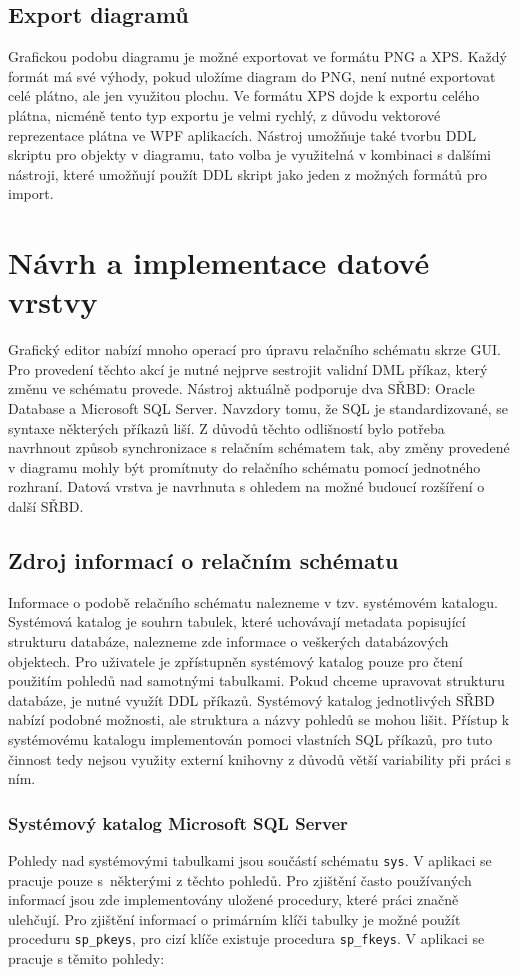 \documentclass[czech,bachelor,public,dept460,male,oneside]{diploma}
\begin{document}
	\subsection{Export diagramů}
	Grafickou podobu diagramu je možné exportovat ve formátu PNG a XPS. Každý formát má své výhody, pokud uložíme diagram do PNG, není nutné exportovat celé plátno, ale jen využitou plochu. Ve formátu XPS dojde k exportu celého plátna, nicméně tento typ exportu je velmi rychlý, z důvodu vektorové reprezentace plátna ve WPF aplikacích. Nástroj umožňuje také tvorbu DDL skriptu pro objekty v diagramu, tato volba je využitelná v kombinaci s dalšími nástroji, které umožňují použít DDL skript jako jeden z možných formátů pro import.
		
\newpage
\section{Návrh a implementace datové vrstvy}
Grafický editor nabízí mnoho operací pro úpravu relačního schématu skrze GUI. Pro provedení těchto akcí je nutné nejprve sestrojit validní DML příkaz, který změnu ve schématu provede. Nástroj aktuálně podporuje dva SŘBD: Oracle Database a Microsoft SQL Server. Navzdory tomu, že SQL je standardizované, se syntaxe některých příkazů liší. Z důvodů těchto odlišností bylo potřeba navrhnout způsob synchronizace s relačním schématem tak, aby změny provedené v diagramu mohly být promítnuty do relačního schématu pomocí jednotného rozhraní. Datová vrstva je navrhnuta s ohledem na možné budoucí rozšíření o další SŘBD.
	
	\subsection{Zdroj informací o relačním schématu} \label{secDataSource}
	Informace o podobě relačního schématu nalezneme v tzv. systémovém katalogu. Systémová katalog je souhrn tabulek, které uchovávají metadata popisující strukturu databáze, nalezneme zde informace o veškerých databázových objektech. Pro uživatele je zpřístupněn systémový katalog pouze pro čtení použitím pohledů nad samotnými tabulkami. Pokud chceme upravovat strukturu databáze, je nutné využít DDL příkazů. Systémový katalog jednotlivých SŘBD nabízí podobné možnosti, ale struktura a názvy pohledů se mohou lišit. Přístup k systémovému katalogu implementován pomoci vlastních SQL příkazů, pro tuto činnost tedy nejsou využity externí knihovny z důvodů větší variability při práci s ním.
	
  		\subsubsection{Systémový katalog Microsoft SQL Server}
  		Pohledy nad systémovými tabulkami jsou součástí schématu \texttt{sys}. V aplikaci se pracuje pouze s~některými z těchto pohledů. Pro zjištění často používaných informací jsou zde implementovány uložené procedury, které práci značně ulehčují. Pro zjištění informací o primárním klíči tabulky je možné použít proceduru \texttt{sp\_pkeys}, pro cizí klíče existuje procedura \texttt{sp\_fkeys}. V aplikaci se pracuje s těmito pohledy: 
  		
\end{document}
